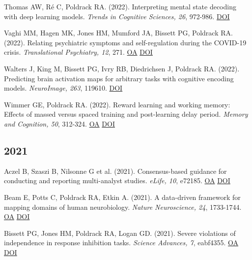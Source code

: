 \documentclass[10pt, letterpaper]{article}
\begin{document}
Thomas AW, Ré C, Poldrack RA.  (2022). Interpreting mental state decoding with deep learning models. \textit{Trends in Cognitive Sciences, 26}, 972-986. \href{https://doi.org/10.1016/j.tics.2022.07.003}{DOI} \vspace{2mm}

Vaghi MM, Hagen MK, Jones HM, Mumford JA, Bissett PG, Poldrack RA.  (2022). Relating psychiatric symptoms and self-regulation during the COVID-19 crisis. \textit{Translational Psychiatry, 12}, 271. \href{https://www.ncbi.nlm.nih.gov/pmc/articles/PMC9274960}{OA} \href{https://doi.org/10.1038/s41398-022-02030-9}{DOI} \vspace{2mm}

Walters J, King M, Bissett PG, Ivry RB, Diedrichsen J, Poldrack RA.  (2022). Predicting brain activation maps for arbitrary tasks with cognitive encoding models. \textit{NeuroImage, 263}, 119610. \href{https://doi.org/10.1016/j.neuroimage.2022.119610}{DOI} \vspace{2mm}

Wimmer GE, Poldrack RA.  (2022). Reward learning and working memory: Effects of massed versus spaced training and post-learning delay period. \textit{Memory and Cognition, 50}, 312-324. \href{https://www.ncbi.nlm.nih.gov/pmc/articles/PMC8821056}{OA} \href{https://doi.org/10.3758/s13421-021-01233-7}{DOI} \vspace{2mm}

\subsection*{2021}Aczel B, Szaszi B, Nilsonne G et al. (2021). Consensus-based guidance for conducting and reporting multi-analyst studies. \textit{eLife, 10}, e72185. \href{https://www.ncbi.nlm.nih.gov/pmc/articles/PMC8626083}{OA} \href{https://doi.org/10.7554/elife.72185}{DOI} \vspace{2mm}

Beam E, Potts C, Poldrack RA, Etkin A.  (2021). A data-driven framework for mapping domains of human neurobiology. \textit{Nature Neuroscience, 24}, 1733-1744. \href{https://www.ncbi.nlm.nih.gov/pmc/articles/PMC8761068}{OA} \href{https://doi.org/10.1038/s41593-021-00948-9}{DOI} \vspace{2mm}

Bissett PG, Jones HM, Poldrack RA, Logan GD.  (2021). Severe violations of independence in response inhibition tasks. \textit{Science Advances, 7}, eabf4355. \href{https://www.ncbi.nlm.nih.gov/pmc/articles/PMC7968836}{OA} \href{https://doi.org/10.1126/sciadv.abf4355}{DOI} \vspace{2mm}
\end{document}
